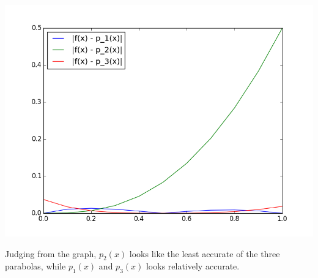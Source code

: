 \documentclass[12pt]{article}
\begin{document}
\begin{center}
\includegraphics[scale=.6]{math_481A_lab1_figure.png}
\end{center}

\noindent Judging from the graph, $p_2(x)$ looks like the least accurate of the three parabolas, while $p_1(x)$ and $p_3(x)$ looks relatively accurate.


%
%
%
%
%
%
\end{document}
